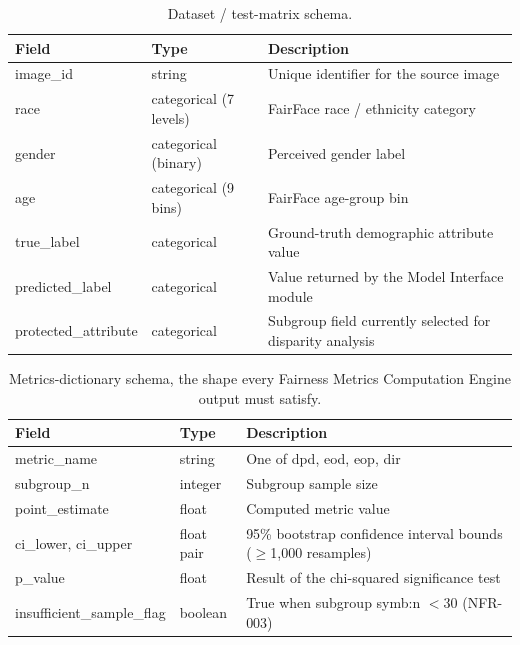 \begin{table}[htbp]
    \centering
    \renewcommand{\arraystretch}{1.3}
    \caption{Dataset / test-matrix schema.}
    \label{tab:schema-testmatrix}
    \begin{tabular}{p{3.8cm}p{2.6cm}p{6.9cm}}
        \toprule
        \textbf{Field} & \textbf{Type} & \textbf{Description} \\
        \midrule
        {\ttfamily\footnotesize image\_id} & string & Unique identifier for the source image \\
        {\ttfamily\footnotesize race} & categorical (7 levels) & FairFace race / ethnicity category \\
        {\ttfamily\footnotesize gender} & categorical (binary) & Perceived gender label \\
        {\ttfamily\footnotesize age} & categorical (9 bins) & FairFace age-group bin \\
        {\ttfamily\footnotesize true\_label} & categorical & Ground-truth demographic attribute value \\
        {\ttfamily\footnotesize predicted\_label} & categorical & Value returned by the Model Interface module \\
        {\ttfamily\scriptsize protected\_attribute} & categorical & Subgroup field currently selected for disparity analysis \\
        \bottomrule
    \end{tabular}
\end{table}

\begin{table}[htbp]
    \centering
    \renewcommand{\arraystretch}{1.3}
    \caption{Metrics-dictionary schema, the shape every Fairness Metrics Computation Engine output must satisfy.}
    \label{tab:schema-metrics}
    \begin{tabular}{p{4.3cm}p{2cm}p{6.9cm}}
        \toprule
        \textbf{Field} & \textbf{Type} & \textbf{Description} \\
        \midrule
        {\ttfamily\footnotesize metric\_name} & string & One of \gls{dpd}, \gls{eod}, \gls{eop}, \gls{dir} \\
        {\ttfamily\footnotesize subgroup\_n} & integer & Subgroup sample size \\
        {\ttfamily\footnotesize point\_estimate} & float & Computed metric value \\
        {\ttfamily\footnotesize ci\_lower}, {\ttfamily\footnotesize ci\_upper} & float pair & 95\% bootstrap confidence interval bounds ($\geq$1{,}000 resamples) \\
        {\ttfamily\footnotesize p\_value} & float & Result of the chi-squared significance test \\
        {\ttfamily\scriptsize insufficient\_sample\_flag} & boolean & True when subgroup \gls{symb:n} $< 30$ (NFR-003) \\
        \bottomrule
    \end{tabular}
\end{table}

